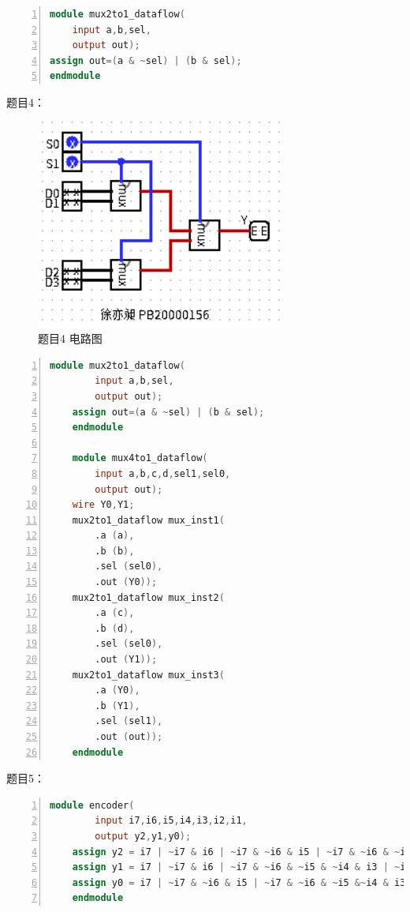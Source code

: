 \documentclass[UTF8]{ctexart}
\begin{document}
\begin{lstlisting}[language={Verilog},numbers=left,numberstyle=\tiny,%frame=shadowbox,  
    rulesepcolor=\color{red!20!green!20!blue!20},  
    keywordstyle=\color{blue!70!black},  
    commentstyle=\color{blue!90!},  
    basicstyle=\ttfamily]
module mux2to1_dataflow(
    input a,b,sel,
    output out);
assign out=(a & ~sel) | (b & sel);
endmodule
\end{lstlisting}
题目4：
\newline
\begin{figure}[h!]
    \centering
    \includegraphics{p4.PNG}
    \caption{题目4 电路图}
\end{figure}
\begin{lstlisting}[language={Verilog},numbers=left,numberstyle=\tiny,%frame=shadowbox,  
    rulesepcolor=\color{red!20!green!20!blue!20},  
    keywordstyle=\color{blue!70!black},  
    commentstyle=\color{blue!90!},  
    basicstyle=\ttfamily]
    module mux2to1_dataflow(
        input a,b,sel,
        output out);
    assign out=(a & ~sel) | (b & sel);
    endmodule
    
    module mux4to1_dataflow(
        input a,b,c,d,sel1,sel0,
        output out);
    wire Y0,Y1;
    mux2to1_dataflow mux_inst1(
        .a (a),
        .b (b),
        .sel (sel0),
        .out (Y0));
    mux2to1_dataflow mux_inst2(
        .a (c),
        .b (d),
        .sel (sel0),
        .out (Y1));
    mux2to1_dataflow mux_inst3(
        .a (Y0),
        .b (Y1),
        .sel (sel1),
        .out (out));
    endmodule
\end{lstlisting}
题目5：
\newline
\begin{lstlisting}[language={Verilog},numbers=left,numberstyle=\tiny,%frame=shadowbox,  
    rulesepcolor=\color{red!20!green!20!blue!20},  
    keywordstyle=\color{blue!70!black},  
    commentstyle=\color{blue!90!},  
    basicstyle=\ttfamily]
    module encoder(
        input i7,i6,i5,i4,i3,i2,i1,
        output y2,y1,y0);
    assign y2 = i7 | ~i7 & i6 | ~i7 & ~i6 & i5 | ~i7 & ~i6 & ~i5 & i4;
    assign y1 = i7 | ~i7 & i6 | ~i7 & ~i6 & ~i5 & ~i4 & i3 | ~i7 & ~i6 & ~i5 & ~i4 & ~i3 & i2;
    assign y0 = i7 | ~i7 & ~i6 & i5 | ~i7 & ~i6 & ~i5 &~i4 & i3 | ~i7 & ~i6 & ~i5 & ~i4 & ~i3 & ~i2 & i1;
    endmodule
\end{lstlisting}
\end{document}

